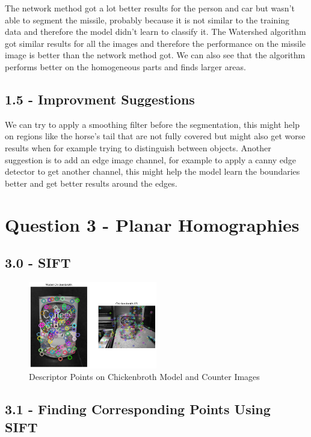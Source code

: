 \documentclass{article}
\begin{document}
The network method got a lot better results for the person and car but wasn’t able to segment the missile, probably because it is not similar to the training data and therefore the model didn’t learn to classify it.
The Watershed algorithm got similar results for all the images and therefore the performance on the missile image is better than the network method got. We can also see that the algorithm performs better on the homogeneous parts and finds larger areas.

\subsection*{1.5 - Improvment Suggestions}

We can try to apply a smoothing filter before the segmentation, this might help on regions like the horse's tail that are not fully covered but might also get worse results when for example trying to distinguish between objects. Another suggestion is to add an edge image channel, for example to apply a canny edge detector to get another channel, this might help the model learn the boundaries better and get better results around the edges.

\section*{Question 3 - Planar Homographies}

\subsection*{3.0 - SIFT}

\begin{figure}[h!]
    \centering
    \includegraphics[width=0.5\textwidth]{../output/3.0_sift.png}
    \caption{Descriptor Points on Chickenbroth Model and Counter Images}
    \label{fig:3_1}
\end{figure}

\subsection*{3.1 - Finding Corresponding Points Using SIFT}
\end{document}
